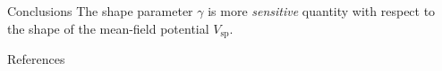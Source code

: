 \documentclass[final]{beamer}
\newlength{\sepwidth}
\newlength{\colwidth}
\newcommand{\separatorcolumn}{\begin{column}{\sepwidth}\end{column}}
\begin{document}
\begin{frame}[t]
\begin{columns}[t]
\begin{column}{\colwidth}
    \begin{block}{Conclusions}
    The shape parameter $\gamma$ is more \emph{sensitive} quantity with respect to the shape of the mean-field potential $V_\text{sp}$.
   
  \end{block}

  \begin{block}{References}

    \nocite{*}
    \tiny{}

  \end{block}

\end{column}

\separatorcolumn

\end{columns}

\end{frame}
\end{document}
